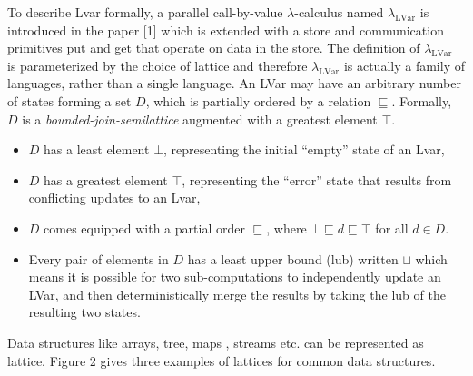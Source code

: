 \documentclass[twocolumn]{article}
\newcommand{\lambdaLVar}{\ensuremath{\lambda_{\textrm{LVar}}}}
\newcommand{\userleq}{\ensuremath{\sqsubseteq}}
\begin{document}
To describe Lvar formally, a parallel call-by-value $\lambda$-calculus named $\lambdaLVar$ is introduced in the paper [1] which is extended with a store and communication primitives put and get that operate on data in the store. The definition of $\lambdaLVar$ is parameterized by the choice of lattice and therefore $\lambdaLVar$ is actually a family of languages, rather than a single language. An LVar may have an arbitrary number of states forming a set $D$, which is partially ordered by a relation $\userleq$. Formally, $D$ is a \emph{bounded-join-semilattice} augmented with a greatest element $\top$. 

\begin{itemize}
\item $D$ has a least element $\bot$, representing the initial “empty” state of an Lvar,
\item $D$ has a greatest element $\top$, representing the “error” state that results from conflicting updates to an Lvar,
\item $D$ comes equipped with a partial order $\userleq$, where $\bot \userleq d \userleq \top$ for all $d \in D$.
\item Every pair of elements in $D$ has a least upper bound (lub) written $\sqcup$ which means it is possible for two sub-computations to independently update an LVar, and then deterministically merge the results by taking the lub of the resulting two states.
\end{itemize}
Data structures like arrays, tree, maps , streams etc. can be represented  as lattice. Figure 2 gives three examples of lattices for common data structures.
 
\end{document}
